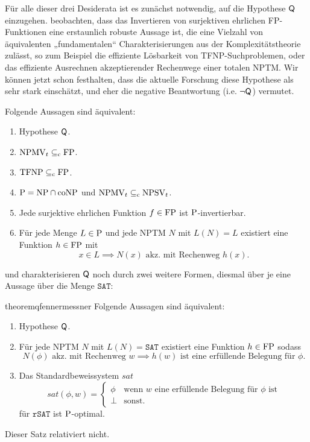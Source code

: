 Für alle dieser drei Desiderata ist es zunächst notwendig, auf die Hypothese $\hQ$ einzugehen.
\textcite{fenner_inverting_2003} beobachten, dass das Invertieren von surjektiven ehrlichen FP-Funktionen eine erstaunlich robuste Aussage ist, die eine Vielzahl von äquivalenten „fundamentalen“ \parencite{fenner_inverting_2003} Charakterisierungen aus der Komplexitätstheorie zulässt, so zum Beispiel die effiziente Lösbarkeit von TFNP-Suchproblemen, oder das effiziente Ausrechnen akzeptierender Rechenwege einer totalen NPTM. Wir können jetzt schon festhalten, dass die aktuelle Forschung diese Hypothese als sehr stark einschätzt, und eher die negative Beantwortung (i.e. $\neg\hQ$) vermutet.


\begin{theorem}\label{thm:q-orig}
    Folgende Aussagen sind äquivalent:
    \begin{enumerate}
        \item Hypothese $\hQ$.
        \item $\mathrm{NPMV}_t\subseteqc \mathrm{FP}$.
        \item $\TFNP\subseteqc \mathrm{FP}$.
        \item $\P=\NP\cap\coNP$ und $\mathrm{NPMV}_t\subseteqc \mathrm{NPSV}_t$.
        \item Jede surjektive ehrlichen Funktion $f\in\FP$ ist $\P$-invertierbar.
        \item Für jede Menge $L\in \P$  und jede NPTM $N$ mit $L(N)=L$ existiert eine Funktion $h\in \FP$ mit 
            \[ x\in L \implies N(x) \text{ akz. mit Rechenweg $h(x)$}. \]
    \end{enumerate}
\end{theorem}

\textcite{fenner_inverting_2003} und \textcite{messner_simulation_2001} charakterisieren $\hQ$ noch durch zwei weitere Formen, diesmal über je eine Aussage über die Menge $\mathtt{SAT}$:

\begin{restatable}{theorem}{qfennermessner}\label{thm:q-fenner-messner}
    Folgende Aussagen sind äquivalent:
\begin{enumerate}[midpenalty=0,endpenalty=10000]
        \item Hypothese $\hQ$.
        \item \parencite{fenner_inverting_2003} Für jede NPTM $N$ mit $L(N)=\mathtt{SAT}$ existiert eine Funktion $h\in \FP$ sodass 
\[ N(\phi) \text{ akz. mit Rechenweg $w$} \implies \text{$h(w)$ ist eine erfüllende Belegung für $\phi$.} \]
        \item \parencite{messner_simulation_2001} Das Standardbeweissystem $\mathit{sat}$
            \[ \mathit{sat}(\phi, w) = \begin{cases} \phi & \text{wenn $w$ eine erfüllende Belegung für $\phi$ ist} \\ \bot & \text{sonst.} \end{cases}\]
            für $\mathtt{rSAT}$ ist $\P$-optimal.
    \end{enumerate}
    Dieser Satz relativiert nicht.
\end{restatable}

